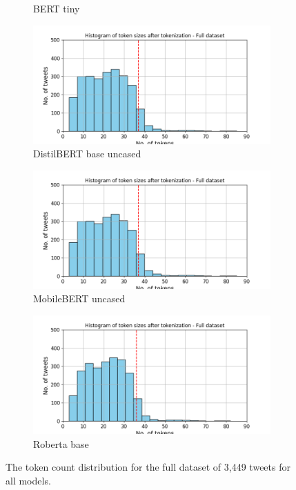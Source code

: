 \begin{figure}[htbp]
\begin{subfigure}[b]{0.48\textwidth}
        \caption{BERT tiny}
        \label{fig: token_pp_hist_tiny}
    \end{subfigure}
    \hfill
    \begin{subfigure}[b]{0.48\textwidth}
        \includegraphics[width=\textwidth]{figures/token_pp_hist_distilbert-base-uncased.png}
        \caption{DistilBERT base uncased}
        \label{fig: token_pp_hist_distilbert}
    \end{subfigure}
    \begin{subfigure}[b]{0.48\textwidth}
        \includegraphics[width=\textwidth]{figures/token_pp_hist_google-mobilebert-uncased.png}
        \caption{MobileBERT uncased}
        \label{fig: token_pp_hist_mobile}
    \end{subfigure}
    \hfill
    \begin{subfigure}[b]{0.48\textwidth}
        \includegraphics[width=\textwidth]{figures/token_pp_hist_roberta-base.png}
        \caption{Roberta base}
        \label{fig: token_pp_hist_roberta}
    \end{subfigure}
    \caption{The token count distribution for the full dataset of 3,449 tweets for all models.}
    \label{fig: apdxa_tokens}
\end{figure}



